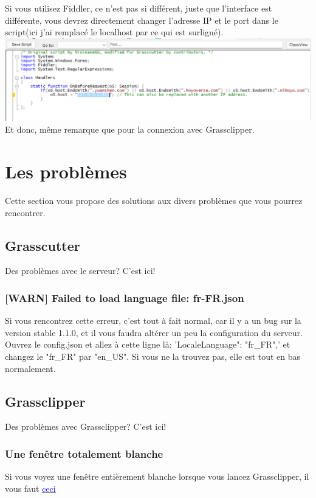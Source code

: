 \documentclass{article}
\begin{document}
Si vous utilisez Fiddler, ce n'est pas si différent, juste que l'interface est différente, vous devrez directement changer l'adresse IP et le port dans le script(ici j'ai remplacé le localhost par ce qui est surligné).\newline
\includegraphics[scale=0.6]{img/fiddler_co.png}\newline
Et donc, même remarque que pour la connexion avec Grassclipper.

\hrulefill

\section{Les problèmes}
Cette section vous propose des solutions aux divers problèmes que vous pourrez rencontrer.

\subsection{Grasscutter}
Des problèmes avec le serveur? C'est ici!

\subsubsection{[WARN] Failed to load language file: fr-FR.json}
Si vous rencontrez cette erreur, c'est tout à fait normal, car il y a un bug sur la version stable 1.1.0, et il vous faudra altérer un peu la configuration du serveur.\newline
Ouvrez le config.json et allez à cette ligne là: 'LocaleLanguage": "fr\_FR",' et changez le "fr\_FR" par "en\_US".\newline
Si vous ne la trouvez pas, elle est tout en bas normalement.

\subsection{Grassclipper}
Des problèmes avec Grassclipper? C'est ici!

\subsubsection{Une fenêtre totalement blanche}
Si vous voyez une fenêtre entièrement blanche lorsque vous lancez Grassclipper, il vous faut \href{https://developer.microsoft.com/en-us/microsoft-edge/webview2/#download}{\textcolor{blue}{ceci}}
\end{document}
